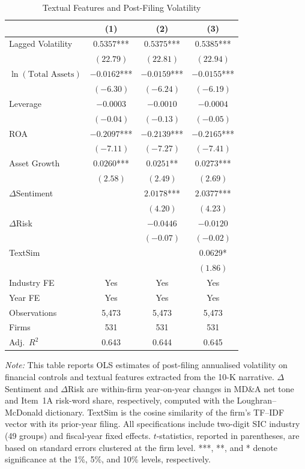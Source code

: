 \begin{table}[htbp]
\centering
\caption{Textual Features and Post-Filing Volatility}
\label{tab:text_regression}
\begin{tabular}{lccc}
\toprule
 & (1) & (2) & (3) \\
\midrule
Lagged Volatility & $0.5357$*** & $0.5375$*** & $0.5385$*** \\
 & $(22.79)$ & $(22.81)$ & $(22.94)$ \\[4pt]
$\ln(\text{Total Assets})$ & $-0.0162$*** & $-0.0159$*** & $-0.0155$*** \\
 & $(-6.30)$ & $(-6.24)$ & $(-6.19)$ \\[4pt]
Leverage & $-0.0003$ & $-0.0010$ & $-0.0004$ \\
 & $(-0.04)$ & $(-0.13)$ & $(-0.05)$ \\[4pt]
ROA & $-0.2097$*** & $-0.2139$*** & $-0.2165$*** \\
 & $(-7.11)$ & $(-7.27)$ & $(-7.41)$ \\[4pt]
Asset Growth & $0.0260$*** & $0.0251$** & $0.0273$*** \\
 & $(2.58)$ & $(2.49)$ & $(2.69)$ \\[4pt]
$\Delta$Sentiment &  & $2.0178$*** & $2.0377$*** \\
 &  & $(4.20)$ & $(4.23)$ \\[4pt]
$\Delta$Risk &  & $-0.0446$ & $-0.0120$ \\
 &  & $(-0.07)$ & $(-0.02)$ \\[4pt]
TextSim &  &  & $0.0629$* \\
 &  &  & $(1.86)$ \\[4pt]
\midrule
Industry FE & Yes & Yes & Yes \\
Year FE & Yes & Yes & Yes \\
Observations & 5,473 & 5,473 & 5,473 \\
Firms & 531 & 531 & 531 \\
Adj.\ $R^2$ & 0.643 & 0.644 & 0.645 \\
\bottomrule
\end{tabular}
\begin{tablenotes}
\item \textit{Note:} This table reports OLS estimates of post-filing annualised volatility on financial controls and textual features extracted from the 10-K narrative. $\Delta$Sentiment and $\Delta$Risk are within-firm year-on-year changes in MD\&A net tone and Item~1A risk-word share, respectively, computed with the Loughran--McDonald dictionary. TextSim is the cosine similarity of the firm's TF--IDF vector with its prior-year filing. All specifications include two-digit SIC industry (49 groups) and fiscal-year fixed effects. $t$-statistics, reported in parentheses, are based on standard errors clustered at the firm level. ***, **, and * denote significance at the 1\%, 5\%, and 10\% levels, respectively.
\end{tablenotes}
\end{table}